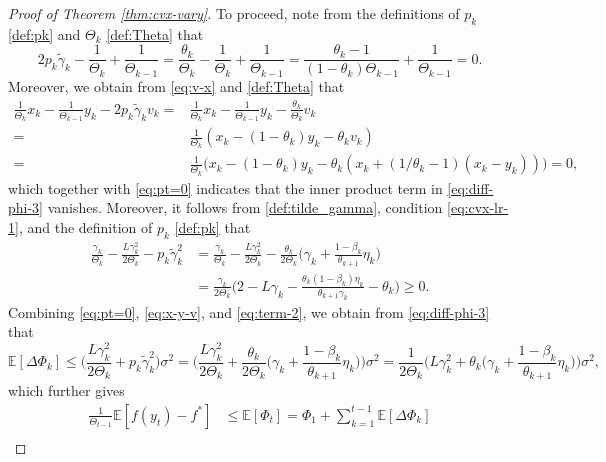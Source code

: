 \documentclass[10pt]{article}
\numberwithin{equation}{section}
\theoremstyle{definition}
\newcommand{\ebb}{\mathbb{E}}  %
\begin{document}
\begin{proof}[Proof of Theorem \ref{thm:cvx-vary}]
To proceed, note from the definitions of $p_k$ \eqref{def:pk} and $\Theta_k$ \eqref{def:Theta} that
\begin{equation}\label{eq:pt=0}
    2 p_k \tilde{\gamma}_k -\frac{1}{\Theta_k}+\frac{1}{\Theta_{k-1}} = \frac{\theta_k}{\Theta_k}-\frac{1}{\Theta_k}+\frac{1}{\Theta_{k-1}} = \frac{\theta_k-1}{(1-\theta_k)\Theta_{k-1}}+\frac{1}{\Theta_{k-1}}=0.
\end{equation}
Moreover, we obtain from \eqref{eq:v-x} and \eqref{def:Theta} that
\begin{equation}\label{eq:x-y-v}
\begin{aligned}
   \frac{1}{\Theta_k} x_k - \frac{1}{\Theta_{k-1}} y_k-2 p_k \tilde{\gamma}_k v_k = & \frac{1}{\Theta_k} x_k - \frac{1}{\Theta_{k-1}} y_k- \frac{\theta_k}{\Theta_k}v_k\\
   =&\frac{1}{\Theta_k}(x_k-(1-\theta_k)y_k-\theta_k v_k)\\
   =&\frac{1}{\Theta_k}\Big(x_k-(1-\theta_k)y_k-\theta_k (x_k+(1/\theta_k-1)(x_k-y_k))\Big) = 0,
\end{aligned}
\end{equation}
which together with \eqref{eq:pt=0} indicates that the inner product term in \eqref{eq:diff-phi-3} vanishes. Moreover, it follows from \eqref{def:tilde_gamma}, condition \eqref{eq:cvx-lr-1}, and the definition of $p_k$ \eqref{def:pk} that
\begin{equation}\label{eq:term-2}
\begin{aligned}
    \frac{\gamma_k}{\Theta_k}-\frac{L \gamma_k^2}{2 \Theta_k}-p_k \tilde{\gamma}_k^2 &= \frac{\gamma_k}{\Theta_k}-\frac{L \gamma_k^2}{2\Theta_k}-\frac{\theta_k}{2\Theta_k}\Big(\gamma_k+\frac{1-\beta_k}{\theta_{k+1}}\eta_k\Big) \\
    &= \frac{\gamma_k}{2\Theta_k}\Big(2-L \gamma_k-\frac{\theta_k(1-\beta_k)\eta_k}{\theta_{k+1}\gamma_k}-\theta_k\Big)\ge 0.
\end{aligned}
\end{equation}
Combining \eqref{eq:pt=0}, \eqref{eq:x-y-v}, and \eqref{eq:term-2}, we obtain from \eqref{eq:diff-phi-3} that
\[
    \ebb[\Delta\Phi_k] \leq \Big(\frac{L \gamma_k^2}{2 \Theta_k}+p_k \tilde{\gamma}_k^2\Big) \sigma^2 = \Big(\frac{L \gamma_k^2}{2 \Theta_k}+\frac{\theta_k}{2\Theta_k}\Big(\gamma_k+\frac{1-\beta_k}{\theta_{k+1}}\eta_k\Big)\Big)\sigma^2 = \frac{1}{2\Theta_k}\Big(L \gamma_k^2+\theta_k\Big(\gamma_k+\frac{1-\beta_k}{\theta_{k+1}}\eta_k\Big)\Big)\sigma^2,
\]
which further gives
\begin{align*}
    \frac{1}{\Theta_{t-1}}\ebb[f(y_t)-f^*]&\leq\ebb[\Phi_t] = \Phi_1+\sum_{k=1}^{t-1}\ebb[\Delta\Phi_k]\\

\end{align*}
\end{proof}
\end{document}
